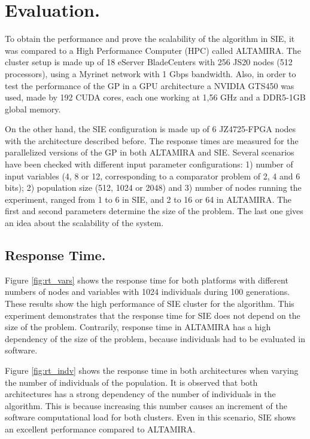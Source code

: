 \documentclass[runningheads,a4paper]{llncs}
\begin{document}
\section{Evaluation.}
To obtain the performance and prove the scalability of the algorithm in SIE, it was compared to a High Performance Computer (HPC) called ALTAMIRA. The cluster setup is made up of 18 eServer BladeCenters with 256 JS20 nodes (512 processors), using a Myrinet network with 1 Gbps bandwidth. Also, in order to test the performance of the GP in a GPU architecture a NVIDIA GTS450 was used, made by 192 CUDA cores, each one working at 1,56 GHz and a DDR5-1GB global memory.

On the other hand, the SIE configuration is made up of 6 JZ4725-FPGA nodes with the architecture described before. The response times are measured for the parallelized versions of the GP in both ALTAMIRA and SIE. Several scenarios have been checked with different input parameter configurations: 1) number of input variables (4, 8 or 12, corresponding to a comparator problem of 2, 4 and 6 bits); 2) population size (512, 1024 or 2048) and 3) number of nodes running the experiment, ranged from 1 to 6 in SIE, and 2 to 16 or 64 in ALTAMIRA. The first and second parameters determine the size of the problem. The last one gives an idea about the scalability of the system.


\subsection{Response Time.}
Figure \ref{fig:rt_vars} shows the response time for both platforms with different numbers of nodes and variables with 1024 individuals during 100 generations. These results show the high performance of SIE cluster for the algorithm. This experiment demonstrates that the response time for SIE does not depend on the size of the problem. Contrarily, response time in ALTAMIRA has a high dependency of the size of the problem, because individuals had to be evaluated in software. 

Figure \ref{fig:rt_indv} shows the response time in both architectures when varying the number of individuals of the population. It is observed that both architectures has a strong dependency of the number of individuals in the algorithm. This is because increasing this number causes an increment of the software computational load for both clusters. Even in this scenario, SIE shows an excellent performance compared to ALTAMIRA.
\end{document}
